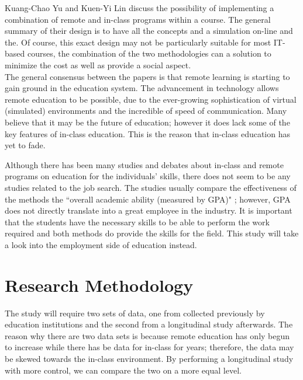 \documentclass[titlepage]{article}
\begin{document}
\noindent Kuang-Chao Yu and Kuen-Yi Lin \cite{6} discuss the possibility of implementing a
combination of remote and in-class programs within a course.  The general summary of their design
is to have all the concepts and a simulation on-line and the.  Of course, this exact design may not be particularly
suitable for most IT-based courses, the combination of the two methodologies can a solution to
minimize the cost as well as provide a social aspect.\\

\noindent The general consensus between the papers is that remote learning is starting to gain ground
in the education system.  The advancement in technology allows remote education to be possible,
due to the ever-growing sophistication of virtual (simulated) environments and the incredible
of speed of communication.  Many believe that it may be the future of education; however it does
lack some of the key features of in-class education.  This is the reason that in-class education
has yet to fade.\\

\clearpage

\noindent Although there has been many studies and debates about in-class and remote programs on
education for the individuals' skills, there does not seem to be any studies related to the job
search.  The studies usually compare the effectiveness of the methods the ``overall academic ability
(measured by GPA)" \cite{3}; however, GPA does not directly translate into a great employee in
the industry. It is important that the students have the necessary skills to be able to perform
the work required and both methods do provide the skills for the field.  This study will take a
look into the employment side of education instead.

\clearpage

\section{Research Methodology}
The study will require two sets of data, one from collected previously by education institutions
and the second from a longitudinal study afterwards. The reason why there are two data sets is
because remote education has only begun to increase while there has be data for in-class for years;
therefore, the data may be skewed towards the in-class environment.  By performing a longitudinal
study with more control, we can compare the two on a more equal level.\\
\end{document}
